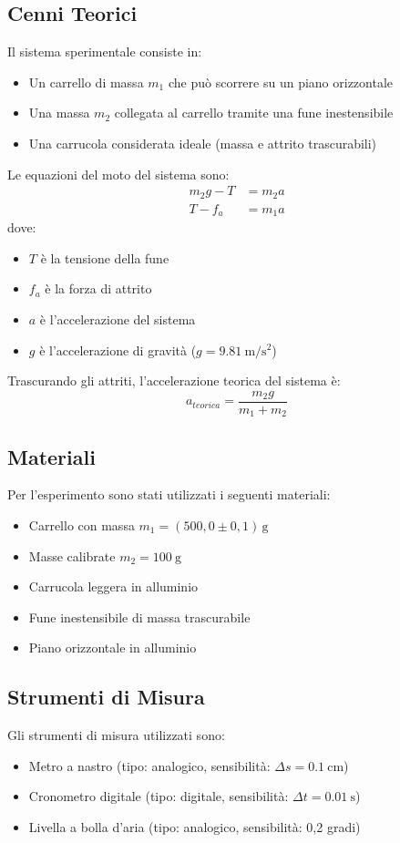 \subsection{Cenni Teorici}
Il sistema sperimentale consiste in:
\begin{itemize}
    \item Un carrello di massa $m_1$ che può scorrere su un piano orizzontale
    \item Una massa $m_2$ collegata al carrello tramite una fune inestensibile
    \item Una carrucola considerata ideale (massa e attrito trascurabili)
\end{itemize}

Le equazioni del moto del sistema sono:
\begin{align}
    m_2g - T &= m_2a \\
    T - f_a &= m_1a
\end{align}
dove:
\begin{itemize}
    \item $T$ è la tensione della fune
    \item $f_a$ è la forza di attrito
    \item $a$ è l'accelerazione del sistema
    \item $g$ è l'accelerazione di gravità ($g = \SI{9,81}{\meter\per\second\squared}$)
\end{itemize}

Trascurando gli attriti, l'accelerazione teorica del sistema è:
\begin{equation}
    a_{teorica} = \frac{m_2g}{m_1 + m_2}
\end{equation}

\subsection{Materiali}
Per l'esperimento sono stati utilizzati i seguenti materiali:
\begin{itemize}
    \item Carrello con massa $m_1 = \left(500,0 \pm 0,1\right)\,\si{\gram}$
    \item Masse calibrate $m_2 = \SI{100}{\gram}$
    \item Carrucola leggera in alluminio
    \item Fune inestensibile di massa trascurabile
    \item Piano orizzontale in alluminio
\end{itemize}

\subsection{Strumenti di Misura}
Gli strumenti di misura utilizzati sono:
\begin{itemize}
    \item Metro a nastro (tipo: analogico, sensibilità: $\Delta s = \SI{0,1}{\centi\meter}$)
    \item Cronometro digitale (tipo: digitale, sensibilità: $\Delta t = \SI{0,01}{\second}$)
    \item Livella a bolla d'aria (tipo: analogico, sensibilità: 0,2 gradi)
\end{itemize}


